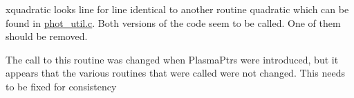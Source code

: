 \begin{DoxyRefList}
\item[\label{bug__bug000005}%
\Hypertarget{bug__bug000005}%
Global \hyperlink{bilinear_8c_af582498786ae60301965c85d405d7cde}{xquadratic} (double a, double b, double c, r)]xquadratic looks line for line identical to another routine quadratic which can be found in \hyperlink{phot__util_8c}{phot\+\_\+util.\+c}. Both versions of the code seem to be called. One of them should be removed. 
\item[\label{bug__bug000010}%
\Hypertarget{bug__bug000010}%
Global \hyperlink{templates_8h_af3162ce29644bbfd1d6ef9060d972643}{xtotal\+\_\+emission} (Wind\+Ptr one, double f1, double f2)]The call to this routine was changed when Plasma\+Ptrs were introduced, but it appears that the various routines that were called were not changed. This needs to be fixed for consistency
\end{DoxyRefList}